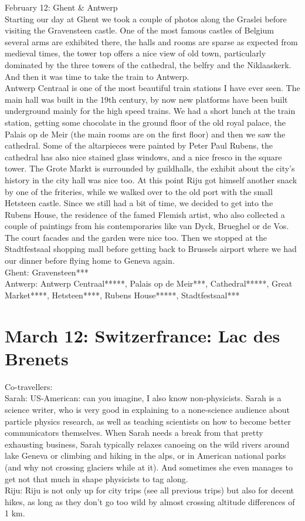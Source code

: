 February 12: Ghent \& Antwerp\\
Starting our day at Ghent we took a couple of photos along the Graslei before visiting the Gravensteen castle. One of the most famous castles of Belgium several arms are exhibited there, the halls and rooms are sparse as expected from medieval times, the tower top offers a nice view of old town, particularly dominated by the three towers of the cathedral, the belfry and the Niklaaskerk. And then it was time to take the train to Antwerp. \\
Antwerp Centraal is one of the most beautiful train stations I have ever seen. The main hall was built in the 19th century, by now new platforms have been built underground mainly for the high speed trains. We had a short lunch at the train station, getting some chocolate in the ground floor of the old royal palace, the Palais op de Meir (the main rooms are on the first floor) and then we saw the cathedral. Some of the altarpieces were painted by Peter Paul Rubens, the cathedral has also nice stained glass windows, and a nice fresco in the square tower. The Grote Markt is surrounded by guildhalls, the exhibit about the city's history in the city hall was nice too. At this point Riju got himself another snack by one of the friteries, while we walked over to the old port with the small Hetsteen castle. Since we still had a bit of time, we decided to get into the Rubens House, the residence of the famed Flemish artist, who also collected a couple of paintings from his contemporaries like van Dyck, Brueghel or de Vos. The court facades and the garden were nice too. Then we stopped at the Stadtfestsaal shopping mall before getting back to Brussels airport where we had our dinner before flying home to Geneva again.\\

Ghent: Gravensteen***\\
Antwerp: Antwerp Centraal*****, Palais op de Meir***, Cathedral*****, Great Market****, Hetsteen****, Rubens House*****, Stadtfestsaal***

\section{March 12: Switzerfrance: Lac des Brenets}
\label{2017:LacDesBrenets}

Co-travellers: \\
Sarah:
US-American: can you imagine, I also know non-physicists. Sarah is a science writer, who is very good in explaining to a none-science audience about particle physics research, as well as teaching scientists on how to become better communicators themselves. When Sarah needs a break from that pretty exhausting business, Sarah typically relaxes canoeing on the wild rivers around lake Geneva or climbing and hiking in the alps, or in American national parks (and why not crossing glaciers while at it). And sometimes she even manages to get not that much in shape physicists to tag along.\\
Riju:
Riju is not only up for city trips (see all previous trips) but also for decent hikes, as long as they don't go too wild by almost crossing altitude differences of 1 km. \\

